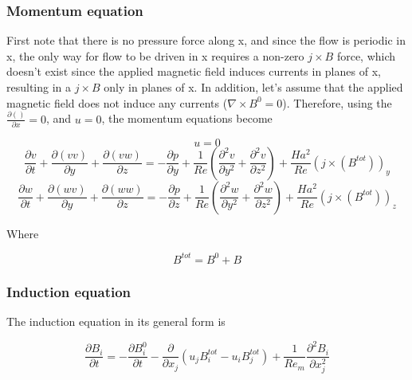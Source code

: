 \documentclass[11pt]{article}
\begin{document}
\subsubsection{Momentum equation}

First note that there is no pressure force along x, and since the flow is periodic in x, the only way for flow to be driven in x requires a non-zero $j\times B$ force, which doesn't exist since the applied magnetic field induces currents in planes of x, resulting in a $j\times B$ only in planes of x. In addition, let's assume that the applied magnetic field does not induce any currents ($\nabla \times B^0=0$). Therefore, using the $\frac{\partial ()}{\partial x} = 0$, and $u = 0$, the momentum equations become

\begin{equation}
	u=0
\end{equation}
\begin{equation}
	\frac{\partial v}{\partial t}
	+ \frac{\partial (v v)}{\partial y}
	+ \frac{\partial (v w)}{\partial z}
	=
	- \frac{\partial p}{\partial y}
	+ \frac{1}{Re}
	\left(
	\frac{\partial^2 v}{\partial y^2}
	+\frac{\partial^2 v}{\partial z^2}
	\right)
	+ \frac{Ha^2}{Re}
	(j \times (B^{tot}))_y
\end{equation}
\begin{equation}
	\frac{\partial w}{\partial t}
	+ \frac{\partial (w v)}{\partial y}
	+ \frac{\partial (w w)}{\partial z}
	=
	- \frac{\partial p}{\partial z}
	+ \frac{1}{Re}
	\left(
	\frac{\partial^2 w}{\partial y^2}
	+\frac{\partial^2 w}{\partial z^2}
	\right)
	+ \frac{Ha^2}{Re}
	(j \times (B^{tot}))_z
\end{equation}

Where

\begin{equation}
	B^{tot} = B^0 + B
\end{equation}

\subsubsection{Induction equation}

The induction equation in its general form is

\begin{equation}
	\frac{\partial B_i}{\partial t}
	=
	- \frac{\partial B_i^0}{\partial t}
	- \frac{\partial}{\partial x_j} (u_j B_i^{tot} - u_i B_j^{tot})
	+
	\frac{1}{Re_m}
	\frac{\partial^2 B_i}{\partial x_j^2}
\end{equation}
\end{document}
